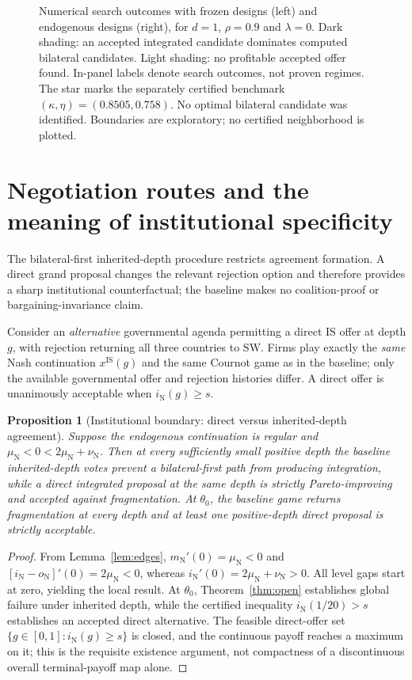 \documentclass[11pt,a4paper]{article}
\newtheorem{proposition}[theorem]{Proposition}
\theoremstyle{remark}\newtheorem{remark}[theorem]{Remark}
\newcommand{\SW}{\mathrm{SW}}\newcommand{\SU}{\mathrm{SU}}\newcommand{\IS}{\mathrm{IS}}
\newcommand{\N}{\mathrm{N}}\newcommand{\F}{\mathrm{F}}
\begin{document}
\begin{figure}[H]
\centering
\resizebox{0.98\linewidth}{!}{}
\caption{Numerical search outcomes with frozen designs (left) and endogenous designs (right), for $d=1$, $\rho=0.9$ and $\lambda=0$. Dark shading: an accepted integrated candidate dominates computed bilateral candidates. Light shading: no profitable accepted offer found. In-panel labels denote search outcomes, not proven regimes. The star marks the separately certified benchmark $(\kappa,\eta)=(0.8505,0.758)$. No optimal bilateral candidate was identified. Boundaries are exploratory; no certified neighborhood is plotted.}
\label{fig:phase}
\end{figure}

\section{Negotiation routes and the meaning of institutional specificity}\label{sec:institution}
The bilateral-first inherited-depth procedure restricts agreement formation. A direct grand proposal changes the relevant rejection option and therefore provides a sharp institutional counterfactual; the baseline makes no coalition-proof or bargaining-invariance claim.

Consider an \emph{alternative} governmental agenda permitting a direct $\IS$ offer at depth $g$, with rejection returning all three countries to $\SW$. Firms play exactly the \emph{same} Nash continuation $x^{\IS}(g)$ and the same Cournot game as in the baseline; only the available governmental offer and rejection histories differ. A direct offer is unanimously acceptable when $i_{\N}(g)\ge s$.

\begin{proposition}[Institutional boundary: direct versus inherited-depth agreement]\label{prop:direct}
Suppose the endogenous continuation is regular and $\mu_{\N}<0<2\mu_{\N}+\nu_{\N}$. Then at every sufficiently small positive depth the baseline inherited-depth votes prevent a bilateral-first path from producing integration, while a \emph{direct} integrated proposal at the same depth is strictly Pareto-improving and accepted against fragmentation. At $\theta_0$, the baseline game returns fragmentation at every depth and at least one positive-depth direct proposal is strictly acceptable.
\end{proposition}
\begin{proof}
From Lemma~\ref{lem:edges}, $m_{\N}'(0)=\mu_{\N}<0$ and $[i_{\N}-o_{\N}]'(0)=2\mu_{\N}<0$, whereas $i_{\N}'(0)=2\mu_{\N}+\nu_{\N}>0$. All level gaps start at zero, yielding the local result. At $\theta_0$, Theorem~\ref{thm:open} establishes global failure under inherited depth, while the certified inequality $i_{\N}(1/20)>s$ establishes an accepted direct alternative. The feasible direct-offer set $\{g\in[0,1]:i_{\N}(g)\ge s\}$ is closed, and the continuous payoff reaches a maximum on it; this is the requisite existence argument, not compactness of a discontinuous overall terminal-payoff map alone.
\end{proof}
\end{document}
